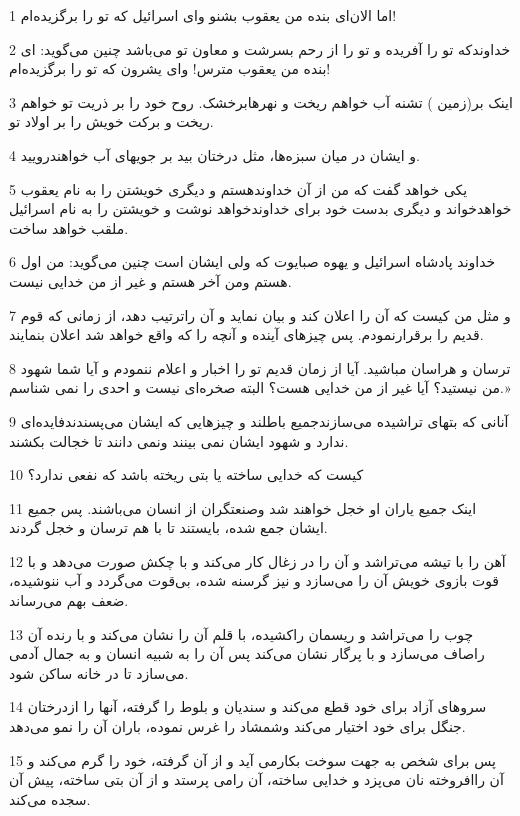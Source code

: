 \par 1 اما الان‌ای بنده من یعقوب بشنو و‌ای اسرائیل که تو را برگزیده‌ام!
\par 2 خداوندکه تو را آفریده و تو را از رحم بسرشت و معاون تو می‌باشد چنین می‌گوید: ای بنده من یعقوب مترس! و‌ای یشرون که تو را برگزیده‌ام!
\par 3 اینک بر(زمین ) تشنه آب خواهم ریخت و نهرهابرخشک. روح خود را بر ذریت تو خواهم ریخت و برکت خویش را بر اولاد تو.
\par 4 و ایشان در میان سبزه‌ها، مثل درختان بید بر جویهای آب خواهندرویید.
\par 5 یکی خواهد گفت که من از آن خداوندهستم و دیگری خویشتن را به نام یعقوب خواهدخواند و دیگری بدست خود برای خداوندخواهد نوشت و خویشتن را به نام اسرائیل ملقب خواهد ساخت.
\par 6 خداوند پادشاه اسرائیل و یهوه صبایوت که ولی ایشان است چنین می‌گوید: من اول هستم ومن آخر هستم و غیر از من خدایی نیست.
\par 7 و مثل من کیست که آن را اعلان کند و بیان نماید و آن راترتیب دهد، از زمانی که قوم قدیم را برقرارنمودم. پس چیزهای آینده و آنچه را که واقع خواهد شد اعلان بنمایند.
\par 8 ترسان و هراسان مباشید. آیا از زمان قدیم تو را اخبار و اعلام ننمودم و آیا شما شهود من نیستید؟ آیا غیر از من خدایی هست؟ البته صخره‌ای نیست و احدی را نمی شناسم.»
\par 9 آنانی که بتهای تراشیده می‌سازندجمیع باطلند و چیزهایی که ایشان می‌پسندندفایده‌ای ندارد و شهود ایشان نمی بینند ونمی دانند تا خجالت بکشند.
\par 10 کیست که خدایی ساخته یا بتی ریخته باشد که نفعی ندارد؟
\par 11 اینک جمیع یاران او خجل خواهند شد وصنعتگران از انسان می‌باشند. پس جمیع ایشان جمع شده، بایستند تا با هم ترسان و خجل گردند.
\par 12 آهن را با تیشه می‌تراشد و آن را در زغال کار می‌کند و با چکش صورت می‌دهد و با قوت بازوی خویش آن را می‌سازد و نیز گرسنه شده، بی‌قوت می‌گردد و آب ننوشیده، ضعف بهم می‌رساند.
\par 13 چوب را می‌تراشد و ریسمان راکشیده، با قلم آن را نشان می‌کند و با رنده آن راصاف می‌سازد و با پرگار نشان می‌کند پس آن را به شبیه انسان و به جمال آدمی می‌سازد تا در خانه ساکن شود.
\par 14 سروهای آزاد برای خود قطع می‌کند و سندیان و بلوط را گرفته، آنها را ازدرختان جنگل برای خود اختیار می‌کند وشمشاد را غرس نموده، باران آن را نمو می‌دهد.
\par 15 پس برای شخص به جهت سوخت بکارمی آید و از آن گرفته، خود را گرم می‌کند و آن راافروخته نان می‌پزد و خدایی ساخته، آن رامی پرستد و از آن بتی ساخته، پیش آن سجده می‌کند.
